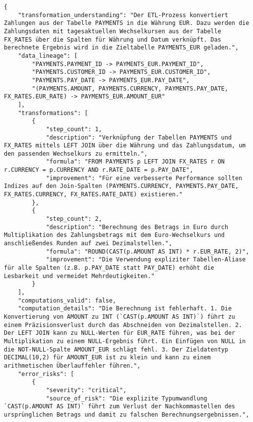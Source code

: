 \begin{lstlisting}[caption={Ausgabe: GEMINI 2.5 Pro Anwendungsfall 4 Robustheitsdurchlauf},label={gemini_case4_prompt3}]
{
    "transformation_understanding": "Der ETL-Prozess konvertiert Zahlungen aus der Tabelle PAYMENTS in die Währung EUR. Dazu werden die Zahlungsdaten mit tagesaktuellen Wechselkursen aus der Tabelle FX_RATES über die Spalten für Währung und Datum verknüpft. Das berechnete Ergebnis wird in die Zieltabelle PAYMENTS_EUR geladen.",
    "data_lineage": [
        "PAYMENTS.PAYMENT_ID -> PAYMENTS_EUR.PAYMENT_ID",
        "PAYMENTS.CUSTOMER_ID -> PAYMENTS_EUR.CUSTOMER_ID",
        "PAYMENTS.PAY_DATE -> PAYMENTS_EUR.PAY_DATE",
        "(PAYMENTS.AMOUNT, PAYMENTS.CURRENCY, PAYMENTS.PAY_DATE, FX_RATES.EUR_RATE) -> PAYMENTS_EUR.AMOUNT_EUR"
    ],
    "transformations": [
        {
            "step_count": 1,
            "description": "Verknüpfung der Tabellen PAYMENTS und FX_RATES mittels LEFT JOIN über die Währung und das Zahlungsdatum, um den passenden Wechselkurs zu ermitteln.",
            "formula": "FROM PAYMENTS p LEFT JOIN FX_RATES r ON r.CURRENCY = p.CURRENCY AND r.RATE_DATE = p.PAY_DATE",
            "improvement": "Für eine verbesserte Performance sollten Indizes auf den Join-Spalten (PAYMENTS.CURRENCY, PAYMENTS.PAY_DATE, FX_RATES.CURRENCY, FX_RATES.RATE_DATE) existieren."
        },
        {
            "step_count": 2,
            "description": "Berechnung des Betrags in Euro durch Multiplikation des Zahlungsbetrags mit dem Euro-Wechselkurs und anschließendes Runden auf zwei Dezimalstellen.",
            "formula": "ROUND(CAST(p.AMOUNT AS INT) * r.EUR_RATE, 2)",
            "improvement": "Die Verwendung expliziter Tabellen-Aliase für alle Spalten (z.B. p.PAY_DATE statt PAY_DATE) erhöht die Lesbarkeit und vermeidet Mehrdeutigkeiten."
        }
    ],
    "computations_valid": false,
    "computation_details": "Die Berechnung ist fehlerhaft. 1. Die Konvertierung von AMOUNT zu INT (`CAST(p.AMOUNT AS INT)`) führt zu einem Präzisionsverlust durch das Abschneiden von Dezimalstellen. 2. Der LEFT JOIN kann zu NULL-Werten für EUR_RATE führen, was bei der Multiplikation zu einem NULL-Ergebnis führt. Ein Einfügen von NULL in die NOT-NULL-Spalte AMOUNT_EUR schlägt fehl. 3. Der Zieldatentyp DECIMAL(10,2) für AMOUNT_EUR ist zu klein und kann zu einem arithmetischen Überlauffehler führen.",
    "error_risks": [
        {
            "severity": "critical",
            "source_of_risk": "Die explizite Typumwandlung `CAST(p.AMOUNT AS INT)` führt zum Verlust der Nachkommastellen des ursprünglichen Betrags und damit zu falschen Berechnungsergebnissen.",

\end{lstlisting}
